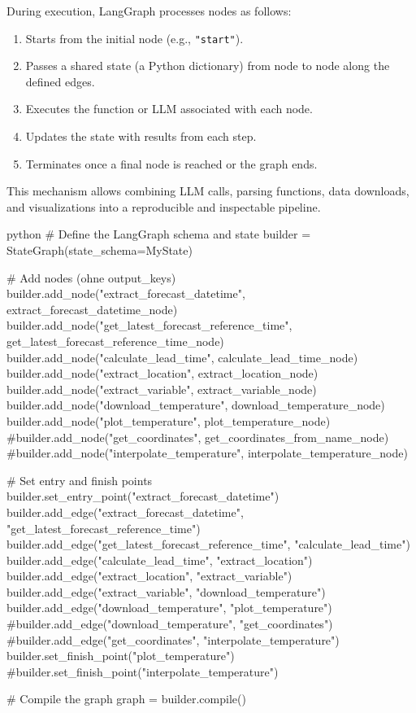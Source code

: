 During execution, LangGraph processes nodes as follows:

\begin{enumerate}
  \item Starts from the initial node (e.g., \texttt{"start"}).
  \item Passes a shared state (a Python dictionary) from node to node along the defined edges.
  \item Executes the function or LLM associated with each node.
  \item Updates the state with results from each step.
  \item Terminates once a final node is reached or the graph ends.
\end{enumerate}

This mechanism allows combining LLM calls, parsing functions, data downloads, and visualizations into a reproducible and inspectable pipeline.

\begin{codeonly}{python}
# Define the LangGraph schema and state
builder = StateGraph(state_schema=MyState)

# Add nodes (ohne output_keys)
builder.add_node("extract_forecast_datetime", extract_forecast_datetime_node)
builder.add_node("get_latest_forecast_reference_time", get_latest_forecast_reference_time_node)
builder.add_node("calculate_lead_time", calculate_lead_time_node)
builder.add_node("extract_location", extract_location_node)
builder.add_node("extract_variable", extract_variable_node)
builder.add_node("download_temperature", download_temperature_node)
builder.add_node("plot_temperature", plot_temperature_node)
#builder.add_node("get_coordinates", get_coordinates_from_name_node)
#builder.add_node("interpolate_temperature", interpolate_temperature_node)

# Set entry and finish points
builder.set_entry_point("extract_forecast_datetime")
builder.add_edge("extract_forecast_datetime", "get_latest_forecast_reference_time")
builder.add_edge("get_latest_forecast_reference_time", "calculate_lead_time")
builder.add_edge("calculate_lead_time", "extract_location")
builder.add_edge("extract_location", "extract_variable")
builder.add_edge("extract_variable", "download_temperature")
builder.add_edge("download_temperature", "plot_temperature")
#builder.add_edge("download_temperature", "get_coordinates")
#builder.add_edge("get_coordinates", "interpolate_temperature")
builder.set_finish_point("plot_temperature")
#builder.set_finish_point("interpolate_temperature")

# Compile the graph
graph = builder.compile()
\end{codeonly}

